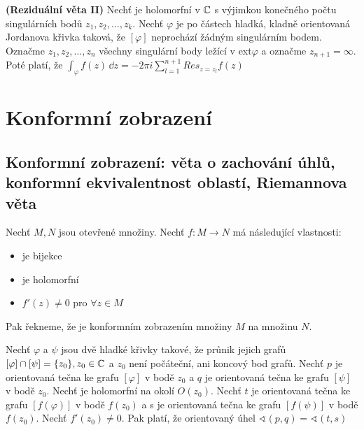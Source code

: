 \begin{theorem}
\textbf{(Reziduální věta II)}
Nechť \fce \fz je holomorfní v $\mathbb{C}$ s výjimkou konečného počtu singulárních bodů $z_1,z_2,\ldots, z_k$. Nechť $\varphi$ je po částech hladká, kladně orientovaná Jordanova křivka taková, že $[\varphi]$ neprochází žádným singulárním bodem. Označme $z_1,z_2,\ldots, z_n$ všechny singulární body ležící v ext$\varphi$ a označme $z_{n+1}=\infty$. Poté platí, že $\int_{\varphi} f(z) \, \dd z = -2\pi i \sum_{l=1}^{n+1}Res_{z=z_l} f(z)$
\end{theorem}




\section{Konformní zobrazení}
\subsection{Konformní zobrazení: věta o zachování úhlů, konformní ekvivalentnost oblastí, Riemannova věta}
\begin{definition}
	Nechť $M,N$ jsou otevřené množiny. Nechť $f:M\rightarrow N$ má následující vlastnosti:
	\begin{itemize}
		\item \fz je bijekce
		\item \fz je holomorfní
		\item $f'(z)\neq 0$ pro $\forall z \in M$
	\end{itemize}
\end{definition} 
Pak řekneme, že \fz je konformním zobrazením množiny $M$ na množinu $N$.

\begin{theorem}
	Nechť $\varphi$ a $\psi$ jsou dvě hladké křivky takové, že průnik jejich grafů $[\varphi] \cap [\psi]=\{z_0\}, z_0\in \mathbb{C} $ a $z_0$ není počáteční, ani koncový bod grafů.
	Nechť $p$ je orientovaná tečna ke grafu $[\varphi]$ v bodě $z_0$ a $q$ je orientovaná tečna ke grafu $[\psi]$ v bodě $z_0$. Nechť \fz je holomorfní na okolí $O(z_0)$. Nechť $t$ je orientovaná tečna ke grafu $[f(\varphi)]$ v bodě $f(z_0)$ a s je orientovaná tečna ke grafu $[f(\psi)]$ v bodě $f(z_0).$ Nechť $f'(z_0) \neq 0$. Pak platí, že orientovaný úhel $\sphericalangle (p,q)=\sphericalangle (t,s)$   
\end{theorem}

